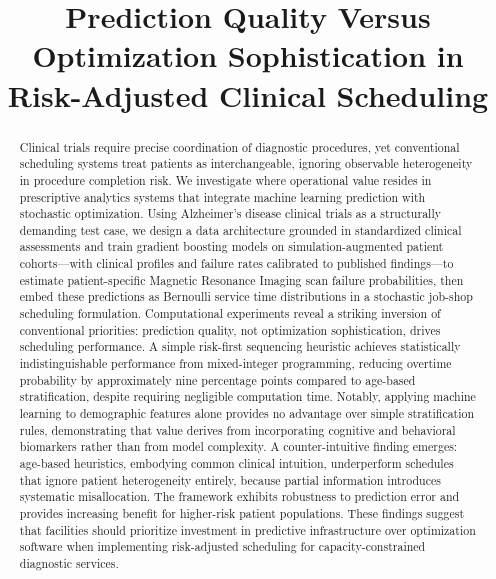 \documentclass[11pt,a4paper]{article}
\title{Prediction Quality Versus Optimization Sophistication in Risk-Adjusted Clinical Scheduling}
\date{}
\begin{document}
\maketitle

\renewcommand{\thefootnote}{*}
\renewcommand{\thefootnote}{\arabic{footnote}}

\begin{abstract}
Clinical trials require precise coordination of diagnostic procedures, yet conventional scheduling systems treat patients as interchangeable, ignoring observable heterogeneity in procedure completion risk. We investigate where operational value resides in prescriptive analytics systems that integrate machine learning prediction with stochastic optimization. Using Alzheimer's disease clinical trials as a structurally demanding test case, we design a data architecture grounded in standardized clinical assessments and train gradient boosting models on simulation-augmented patient cohorts---with clinical profiles and failure rates calibrated to published findings---to estimate patient-specific Magnetic Resonance Imaging scan failure probabilities, then embed these predictions as Bernoulli service time distributions in a stochastic job-shop scheduling formulation. Computational experiments reveal a striking inversion of conventional priorities: prediction quality, not optimization sophistication, drives scheduling performance. A simple risk-first sequencing heuristic achieves statistically indistinguishable performance from mixed-integer programming, reducing overtime probability by approximately nine percentage points compared to age-based stratification, despite requiring negligible computation time. Notably, applying machine learning to demographic features alone provides no advantage over simple stratification rules, demonstrating that value derives from incorporating cognitive and behavioral biomarkers rather than from model complexity. A counter-intuitive finding emerges: age-based heuristics, embodying common clinical intuition, underperform schedules that ignore patient heterogeneity entirely, because partial information introduces systematic misallocation. The framework exhibits robustness to prediction error and provides increasing benefit for higher-risk patient populations. These findings suggest that facilities should prioritize investment in predictive infrastructure over optimization software when implementing risk-adjusted scheduling for capacity-constrained diagnostic services.
\end{abstract}
\end{document}
